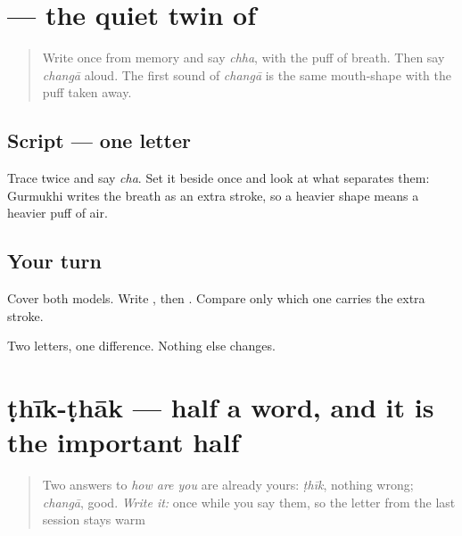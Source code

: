 \section[\texorpdfstring{\pa{ਚ} (cha)}{ਚ (cha)}]{ — the quiet twin of }

\label{lesson:PA-W09-chacha}



\begin{quote}
Write \textbf{} once from memory and say \emph{chha}, with the puff of breath. Then say \emph{changā} aloud. The first sound of \emph{changā} is the same mouth-shape with the puff taken away.
\end{quote}

\subsection*{Script — one letter}

Trace \textbf{} twice and say \emph{cha}. Set it beside \textbf{} once and look at what separates them: Gurmukhi writes the breath as an extra stroke, so a heavier shape means a heavier puff of air.

\subsection*{Your turn}
Cover both models. Write \textbf{}, then \textbf{}. Compare only which one carries the extra stroke.

\begin{tcolorbox}[breakable,colback=teal!4,colframe=teal!35!black,title={Before you move on}]
Two letters, one difference. Nothing else changes.
\end{tcolorbox}
\section[\texorpdfstring{\pa{ਠੀਕ}-\pa{ਠਾਕ} (ṭhīk-ṭhāk)}{ਠੀਕ-ਠਾਕ (ṭhīk-ṭhāk)}]{ṭhīk-ṭhāk — half a word, and it is the important half}

\label{lesson:PA-C32-thik-thak}



\begin{quote}
Two answers to \emph{how are you} are already yours: \emph{ṭhīk}, nothing wrong; \emph{changā}, good. \emph{Write it:} \textbf{} once while you say them, so the letter from the last session stays warm
\end{quote}

